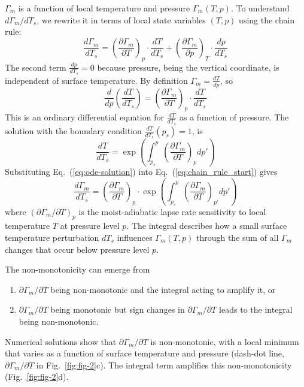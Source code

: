 \documentclass[]{ametsocV6.1}
\begin{document}
$\Gamma_m$ is a function of local temperature and pressure $\Gamma_m(T, p)$. To understand $d\Gamma_m/dT_s$, we rewrite it in terms of local state variables $(T, p)$ using the chain rule: 
\begin{equation}
\frac{d\Gamma_m}{dT_s} = \left(\frac{\partial\Gamma_m}{\partial T}\right)_p \cdot \frac{dT}{dT_s} + \left(\frac{\partial\Gamma_m}{\partial p}\right)_T \cdot \frac{dp}{dT_s} \label{eq:chain_rule_start}
\end{equation}
The second term $\frac{dp}{dT_s}=0$ because pressure, being the vertical coordinate, is independent of surface temperature. By definition $\Gamma_m = \frac{dT}{dp}$, so
\begin{equation}
    \frac{d}{dp}\left(\frac{dT}{dT_s}\right) = \left(\frac{\partial\Gamma_m}{\partial T}\right)_p \cdot \frac{dT}{dT_s} 
    \label{eq:ode}
\end{equation}
This is an ordinary differential equation for $\frac{dT}{dT_s}$ as a function of pressure. The solution with the boundary condition $\frac{dT}{dT_s}(p_s) = 1$, is
\begin{equation}
    \frac{dT}{dT_s} = \exp\left(\int_{p_s}^{p} \left(\frac{\partial\Gamma_m}{\partial T}\right)_p dp'\right)
    \label{eq:ode-solution}
\end{equation}
Substituting Eq.~(\ref{eq:ode-solution}) into Eq.~(\ref{eq:chain_rule_start}) gives
\begin{equation}
\frac{d\Gamma_m}{dT_s} = \left(\frac{\partial\Gamma_m}{\partial T}\right)_p \cdot \exp\left(\int_{p_s}^{p} \left(\frac{\partial\Gamma_m}{\partial T}\right)_{p'} dp'\right) \label{eq:total_sensitivity}
\end{equation}
where $(\partial\Gamma_m/\partial T)_p$ is the moist-adiabatic lapse rate sensitivity to local temperature $T$ at pressure level $p$. The integral describes how a small surface temperature perturbation $dT_s$ influences $\Gamma_m(T, p)$ through the sum of all $\Gamma_m$ changes that occur below pressure level $p$.

The non-monotonicity can emerge from 
\begin{enumerate}
\item $\partial\Gamma_m/\partial T$ being non-monotonic and the integral acting to amplify it, or 
\item $\partial\Gamma_m/\partial T$ being monotonic but sign changes in $\partial\Gamma_m/\partial T$ leads to the integral being non-monotonic. 
\end{enumerate}
Numerical solutions show that $\partial\Gamma_m/\partial T$ is non-monotonic, with a local minimum that varies as a function of surface temperature and pressure (dash-dot line, $\partial\Gamma_m/\partial T$ in Fig.~\ref{fig:fig-2}c). The integral term amplifies this non-monotonicity (Fig.~\ref{fig:fig-2}d).
\end{document}
